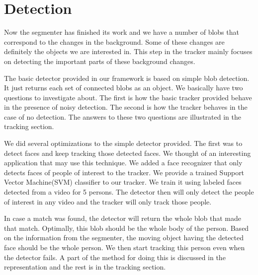\section{Detection}

Now the segmenter has finished its work and we have a number of blobs that correspond to the changes in the background. Some of these changes are definitely the objects we are interested in. This step in the tracker mainly focuses on detecting the important parts of these background changes.

The basic detector provided in our framework is based on simple blob detection. It just returns each set of connected blobs as an object. We basically have two questions to investigate about. The first is how the basic tracker provided behave in the presence of noisy detection. The second is how the tracker behaves in the case of no detection. The answers to these two questions are illustrated in the tracking section.

We did several optimizations to the simple detector provided. The first was to detect faces and keep tracking those detected faces. We thought of an interesting application that may use this technique. We added a face recognizer that only detects faces of people of interest to the tracker. We provide a trained Support Vector Machine(SVM) classifier to our tracker. We train it using labeled faces detected from a video for 5 persons. The detector then will only detect the people of interest in any video and the tracker will only track those people.

In case a match was found, the detector will return the whole blob that made that match. Optimally, this blob should be the whole body of the person. Based on the information from the segmenter, the moving object having the detected face should be the whole person. We then start tracking this person even when the detector fails. A part of the method for doing this is discussed in the representation and the rest is in the tracking section.